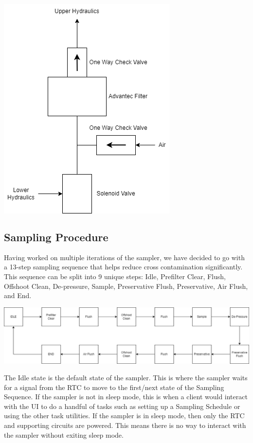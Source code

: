 \documentclass[11pt, letterpaper]{article}
\begin{document}
\begin{center}
	\includegraphics[scale=0.75]{./Assets/PolyWAG_HX_HD_Filter.png}
\end{center}

\subsection{Sampling Procedure}
Having worked on multiple iterations of the sampler, we have decided to go with a 13-step sampling sequence that helps reduce cross contamination significantly. This sequence can be split into 9 unique steps: Idle, Prefilter Clear, Flush, Offshoot Clean, De-pressure, Sample, Preservative Flush, Preservative, Air Flush, and End.

\begin{center}
	\includegraphics[scale=0.4]{./Assets/Sampling Sequence.drawio.png}
\end{center}

The Idle state is the default state of the sampler. This is where the sampler waits for a signal from the RTC to move to the first/next state of the Sampling Sequence. If the sampler is not in sleep mode, this is when a client would interact with the UI to do a handful of tasks such as setting up a Sampling Schedule or using the other task utilities. If the sampler is in sleep mode, then only the RTC and supporting circuits are powered. This means there is no way to interact with the sampler without exiting sleep mode.
\end{document}
